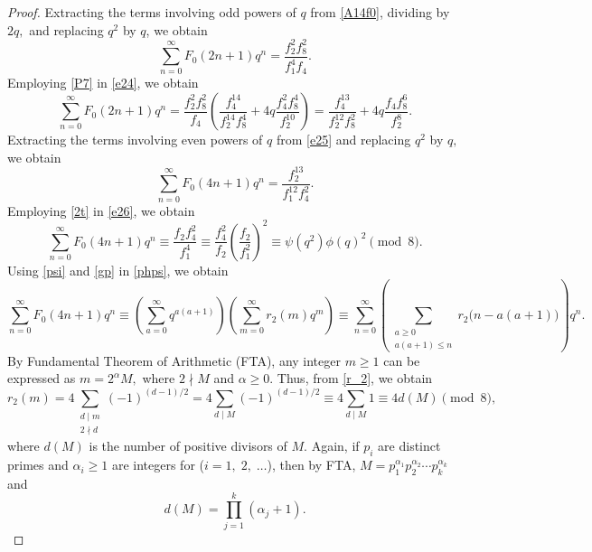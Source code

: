 \documentclass[10pt,a4paper]{amsart}
\begin{document}
\begin{proof}
    Extracting the terms involving odd powers of $q$ from \eqref{A14f0}, dividing by $2q,$ and replacing $q^2$ by $q$,  we obtain
\begin{equation}\label{e24}
\sum_{n=0}^{\infty}F_0(2n+1)q^n
=
\dfrac{f_2^2f_8^2}{f_1^4f_4}.
\end{equation}
Employing \eqref{P7} in \eqref{e24}, we obtain
\begin{equation}\label{e25}
\sum_{n=0}^{\infty}F_0(2n+1)q^n
=
\dfrac{f_2^2f_8^2}{f_4}
\left(
\dfrac{f_4^{14}}{f_2^{14}f_8^4}
+
4q\dfrac{f_4^2f_8^4}{f_2^{10}}
\right) 
=
\dfrac{f_4^{13}}{f_2^{12}f_8^2}
+
4q\dfrac{f_4f_8^6}{f_2^8}.
\end{equation}
Extracting the terms involving even powers of $q$ from \eqref{e25} and replacing $q^2$ by $q,$ we obtain
\begin{equation}\label{e26}
\sum_{n=0}^{\infty}F_0(4n+1)q^n
=
\dfrac{f_2^{13}}{f_1^{12}f_4^2}.
\end{equation}
Employing \eqref{2t} in \eqref{e26},
we obtain
\begin{equation}\label{phps}
\sum_{n=0}^{\infty}F_0(4n+1)q^n
\equiv
\dfrac{f_2f_4^2}{f_1^4}
\equiv\dfrac{f_4^2}{f_2}
\left(\dfrac{f_2}{f_1^2}\right)^2
\equiv\psi(q^2)\phi(q)^2
\pmod 8.
\end{equation}
Using \eqref{psi} and \eqref{gp} in \eqref{phps}, we obtain
\begin{equation}\label{fg8}
\sum_{n=0}^{\infty}F_0(4n+1)q^n
\equiv
\left(\sum_{a=0}^{\infty}q^{a(a+1)}\right)
\left(\sum_{m=0}^{\infty}r_2(m)q^m\right) 
\equiv
\sum_{n=0}^{\infty}
\left(
\sum_{\substack{a\geq0\\a(a+1)\leq n}}
r_2\bigl(n-a(a+1)\bigr)
\right)q^n.
\end{equation}
By  Fundamental Theorem of Arithmetic (FTA), any integer $m\geq1$ can be expressed as $m=2^\alpha M,$ where $2\nmid M$ and $\alpha\geq0.$ Thus, from \eqref{r_2}, we obtain
\begin{equation}\label{fg8e}
r_2(m)
=
4\sum_{\substack{d\mid m\\2\nmid d}}(-1)^{(d-1)/2}
=
4\sum_{d\mid M}(-1)^{(d-1)/2} 
\equiv
4\sum_{d\mid M}1
\equiv
4d(M)
\pmod 8,
\end{equation}
where $d(M)$ is the number of positive divisors of $M.$ Again, if $p_i$ are distinct primes  and $\alpha_i\geq1$ are integers for ($i=1,\;2,\;\ldots$), then by FTA, 
$M=p_1^{\alpha_1}p_2^{\alpha_2}\cdots p_k^{\alpha_k}$
and 
\begin{equation}\label{fg10}
d(M)
=
\prod_{j=1}^{k}(\alpha_j+1).

\end{equation}
\end{proof}
\end{document}
